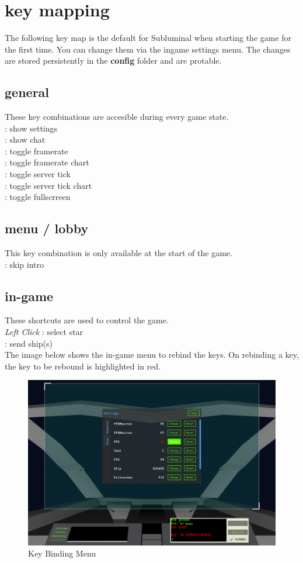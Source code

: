\chapter*{key mapping}
The following key map is the default for Subluminal when starting the game for the first time. You can change them via the ingame settings menu. The changes are stored persistently in the \textbf{config} folder and are protable.

\section*{general}
These key combinations are accesible during every game state.\\[0.5em]
 : show settings \\[0.5em]
 : show chat \\[0.5em]
 : toggle framerate \\[0.5em]
 : toggle framerate chart \\[0.5em]
 : toggle server tick \\[0.5em]
 : toggle server tick chart \\[0.5em]
 : toggle fullscrreen \\[0.5em]
  
\section*{menu / lobby}
This key combination is only available at the start of the game.\\[0.5em]
\Esc : skip intro\\[0.5em]

\section*{in-game}
These shortcuts are used to control the game.\\[0.5em]
\emph{Left Click} : select star \\[0.5em]
\Return : send ship(s) \\[0.5em]

\noindent
The image below shows the in-game menu to rebind the keys. On rebinding a key, the key to be rebound is highlighted in red.\\
\begin{figure}[!htb]
  \centering
  \includegraphics[width=.85\textwidth]{chapters/keybindings/keybinding.png}
  \caption*{Key Binding Menu}
\end{figure}
